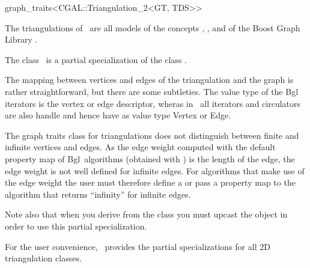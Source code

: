 

\begin{ccRefClass}{graph_traits<CGAL::Triangulation_2<GT, TDS>>}

\ccDefinition
  
The triangulations of \cgal\ are all models of the concepts ,
, and   of the Boost Graph Library \cite{}.

The class \ccRefName\ is a partial specialization of the class 
{}.


The mapping between vertices and edges of the triangulation and the
graph is rather straightforward, but there are some subtleties. The
value type of the {\sc Bgl} iterators is the vertex or edge descriptor,
wheras in \cgal\ all iterators and circulators are also handle and
hence have as value type Vertex or Edge.

The graph traits class for triangulations does not distinguish between
finite and infinite vertices and edges. As the edge weight computed
with the default property map of {\sc Bgl}\ algorithms (obtained with
) is the length of the edge, 
the edge weight is not well defined for infinite edges. For algorithms 
that make use of the edge weight the user must therefore
define a 
{} or pass a property map to the
algorithm that returns ``infinity'' for infinite edges. 


Note also that when you derive from the class 
you must upcast the object in order to use this partial specialization.

For the user convenience, \cgal\ provides the partial specializations
for all 2D triangulation classes.






\ccTypes




\end{ccRefClass}
